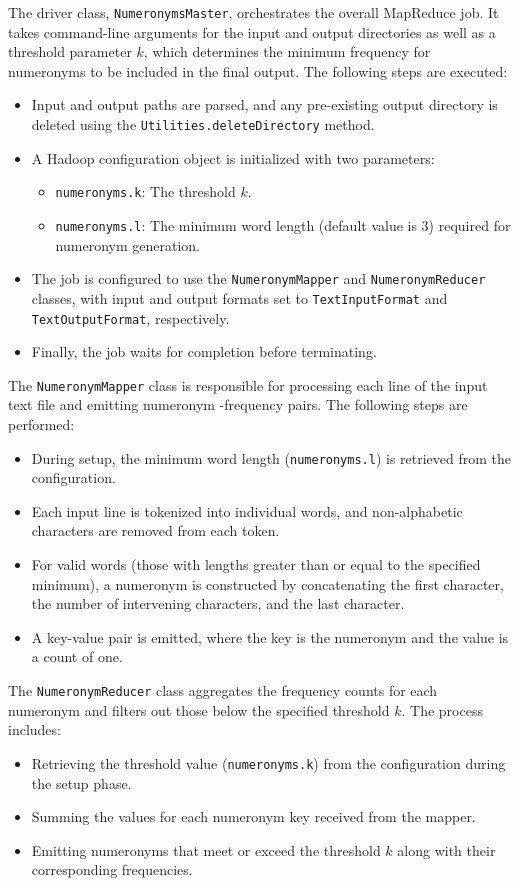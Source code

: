 \documentclass[acmlarge]{acmart}
\begin{document}
The driver class, \texttt{NumeronymsMaster}, orchestrates the overall MapReduce job.
It takes command-line arguments for the input and output directories as well as a threshold parameter $k$, which
determines the minimum frequency for numeronyms to be included in the final output.
The following steps are executed:
\begin{itemize}
  \item Input and output paths are parsed, and any pre-existing output directory is deleted using the
        \texttt{Utilities.deleteDirectory} method.
  \item A Hadoop configuration object is initialized with two parameters:
  \begin{itemize}
    \item \texttt{numeronyms.k}: The threshold $k$.
    \item \texttt{numeronyms.l}: The minimum word length (default value is 3) required for numeronym generation.
  \end{itemize}
  \item The job is configured to use the \texttt{NumeronymMapper} and \texttt{NumeronymReducer} classes, with input and
        output formats set to \texttt{TextInputFormat} and \texttt{TextOutputFormat}, respectively.
  \item Finally, the job waits for completion before terminating.
\end{itemize}

The \texttt{NumeronymMapper} class is responsible for processing each line of the input text file and emitting numeronym
-frequency pairs.
The following steps are performed:
\begin{itemize}
  \item During setup, the minimum word length (\texttt{numeronyms.l}) is retrieved from the configuration.
  \item Each input line is tokenized into individual words, and non-alphabetic characters are removed from each token.
  \item For valid words (those with lengths greater than or equal to the specified minimum), a numeronym is constructed
        by concatenating the first character, the number of intervening characters, and the last character.
  \item A key-value pair is emitted, where the key is the numeronym and the value is a count of one.
\end{itemize}

The \texttt{NumeronymReducer} class aggregates the frequency counts for each numeronym and filters out those below the
specified threshold $k$.
The process includes:
\begin{itemize}
  \item Retrieving the threshold value (\texttt{numeronyms.k}) from the configuration during the setup phase.
  \item Summing the values for each numeronym key received from the mapper.
  \item Emitting numeronyms that meet or exceed the threshold $k$ along with their corresponding frequencies.
\end{itemize}
\end{document}
